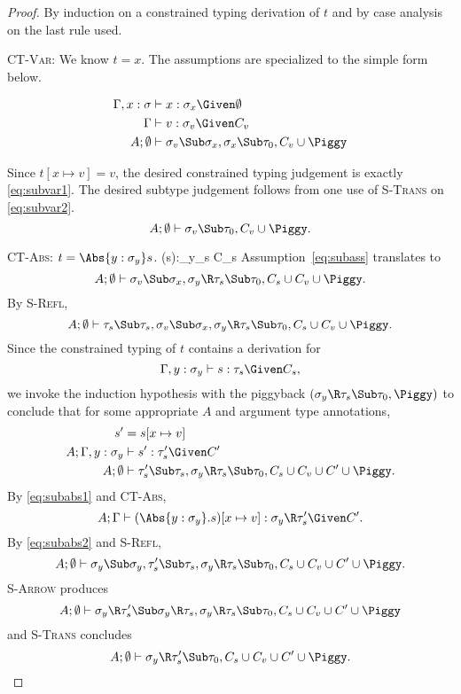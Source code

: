 \documentclass{amsart}
\theoremstyle{definition}
\begin{document}
\begin{proof}
By induction on a constrained typing derivation of $t$ and by
case analysis on the last rule used.

\Case\textsc{CT-Var}: We know $t=x$. The assumptions are
specialized to the simple form below.
\begin{samepage}
\begin{align}
\Gamma,x:\sigma&\vdash x:\sigma_x\Given\emptyset
\notag
\\
\Gamma&\vdash v:\sigma_v\Given C_v
\label{eq:subvar1}
\\
A;\emptyset&\vdash \sigma_v\Sub\sigma_x,\sigma_x\Sub\tau_0,C_v\cup\Piggy
\label{eq:subvar2}
\end{align}
\end{samepage}%
Since $t[x\mapsto v]=v$, the desired constrained typing judgement
is exactly \eqref{eq:subvar1}. The desired subtype judgement
follows from one use of \textsc{S-Trans} on \eqref{eq:subvar2}.
\[
A;\emptyset\vdash \sigma_v\Sub\tau_0,C_v\cup\Piggy.
\]

\Case\textsc{CT-Abs}: $t=\Abs{y:\sigma_y}s$.
\def\yasump{\Gamma,y:\sigma_y\vdash s:\tau_s\Given C_s}
\infrule[CT-Abs]
{\yasump}
{\Gamma\vdash(s):\sigma_y\R\tau_s \Given C_s}
Assumption~\eqref{eq:subass} translates to
\[
A;\emptyset\vdash
\sigma_v\Sub\sigma_x,
\sigma_y\R\tau_s\Sub\tau_0,C_s\cup C_v\cup\Piggy.
\]
By \textsc{S-Refl},
\[
A;\emptyset\vdash
    \tau_s\Sub\tau_s,
\sigma_v\Sub\sigma_x,
\sigma_y\R\tau_s\Sub\tau_0,C_s\cup C_v\cup\Piggy.
\]
Since the constrained typing of $t$ contains a derivation for
\[\yasump,\]
we invoke the induction hypothesis with the piggyback
$(\sigma_y\R\tau_s\Sub\tau_0,\Piggy)$ to conclude that for some
appropriate $A$ and argument type annotations,
\begin{align}
s'&=s[x\mapsto v]\notag
\\
A;\Gamma,y:\sigma_y&\vdash s' : \tau_s'\Given C'
\label{eq:subabs1}
\\
A;\emptyset&\vdash
    \tau_s'\Sub\tau_s,
\sigma_y\R\tau_s\Sub\tau_0,C_s\cup C_v\cup C'\cup\Piggy.
\label{eq:subabs2}
\end{align}
By \eqref{eq:subabs1} and \textsc{CT-Abs},
\[
A;\Gamma\vdash(\Abs{y:\sigma_y}.s)[x\mapsto v] : \sigma_y\R\tau_s'\Given C'.
\]
By \eqref{eq:subabs2} and \textsc{S-Refl},
\[
A;\emptyset\vdash
    \sigma_y\Sub\sigma_y,
    \tau_s'\Sub\tau_s,
\sigma_y\R\tau_s\Sub\tau_0,C_s\cup C_v\cup C'\cup\Piggy.
\]
\textsc{S-Arrow} produces
\[
A;\emptyset\vdash
    \sigma_y\R\tau_s'\Sub\sigma_y\R\tau_s,
\sigma_y\R\tau_s\Sub\tau_0,C_s\cup C_v\cup C'\cup\Piggy
\]
and \textsc{S-Trans} concludes
\[
A;\emptyset\vdash
    \sigma_y\R\tau_s'\Sub\tau_0,
C_s\cup C_v\cup C'\cup\Piggy.
\]


\end{proof}
\end{document}
